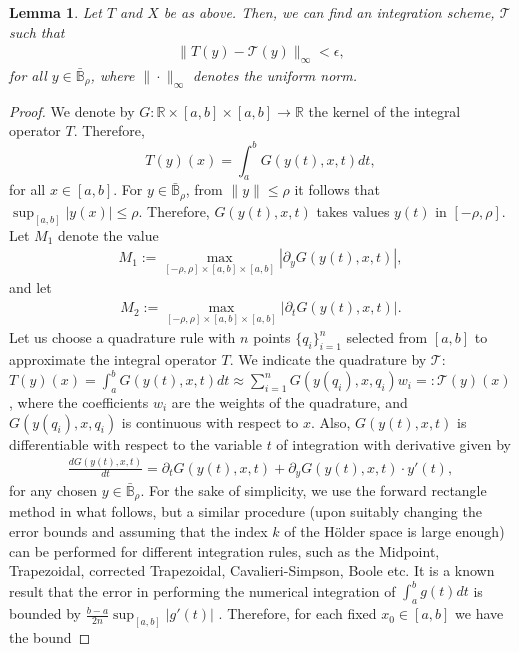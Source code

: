 \documentclass[a4paper,12pt,reqno]{amsart}
\newtheorem{lem}[thm]{Lemma}
\theoremstyle{definition}
\theoremstyle{remark}
\begin{document}
\begin{lem}\label{lem:int_scheme}
        Let $T$ and $X$ be as above. Then, we can find an integration scheme, $\mathcal T$ such that 
        \begin{eqnarray}
            \|T(y) - \mathcal T(y)\|_{\infty} < \epsilon,
        \end{eqnarray}    
        for all $y\in \bar {\mathbb B}_\rho$, where $\|\cdot \|_{\infty}$ denotes the uniform norm. 
\end{lem}
\begin{proof}
    We denote by $G : \mathbb R\times [a,b]\times [a,b] \longrightarrow \mathbb R$ the kernel of the integral operator $T$. Therefore,
    \[T(y)(x) = \int_a^b G(y(t),x,t)dt,\] for all $x\in [a,b]$. For $y \in \bar {\mathbb B}_\rho$, from $\|y\| \leq \rho$ it follows that $\sup_{[a,b]} |y(x)| \leq \rho$. Therefore, $G(y(t),x,t)$ takes values $y(t)$ in $[-\rho,\rho]$. Let $M_1$ denote the value 
    \begin{eqnarray*}
        M_1 := \max_{[-\rho,\rho]\times [a,b]\times [a,b]} |\partial_y G(y(t),x,t)|,
    \end{eqnarray*} and let 
    \begin{eqnarray*}
        M_2 := \max_{[-\rho,\rho]\times [a,b]\times [a,b]} |\partial_t G(y(t),x,t)|.
    \end{eqnarray*}
  Let us choose a quadrature rule  with $n$ points $\{q_i\}_{i=1}^n$ selected from $[a,b]$ to approximate the integral operator $T$. We indicate the quadrature by $\mathcal T$: $T(y)(x)  = \int_a^bG(y(t),x,t)dt \approx \sum_{i=1}^n G(y(q_i),x,q_i)w_i =: \mathcal T(y)(x)$, where the coefficients $w_i$ are the weights of the quadrature, and $G(y(q_i),x,q_i)$ is continuous with respect to $x$. Also, $G(y(t),x,t)$ is differentiable with respect to the variable $t$ of integration with derivative given by
  \begin{eqnarray*}
      \frac{dG(y(t),x,t)}{dt} = \partial_t G(y(t),x,t) + \partial_y G(y(t),x,t)\cdot y'(t),
  \end{eqnarray*}
     for any chosen $y\in \bar{\mathbb B}_\rho$. For the sake of simplicity, we use the forward rectangle method in what follows, but a similar procedure (upon suitably changing the error bounds and assuming that the index $k$ of the H\"older space is large enough) can be performed for different integration rules, such as the Midpoint, Trapezoidal, corrected Trapezoidal, Cavalieri-Simpson, Boole etc. It is a known result that the error in performing the numerical integration of $\int_a^bg(t)dt$ is bounded by $\frac{b-a}{2n}\sup_{[a,b]} |g'(t)|$ \cite{young1988survey}. Therefore, for each fixed $x_0\in [a,b]$ we have the bound

\end{proof}
\end{document}
